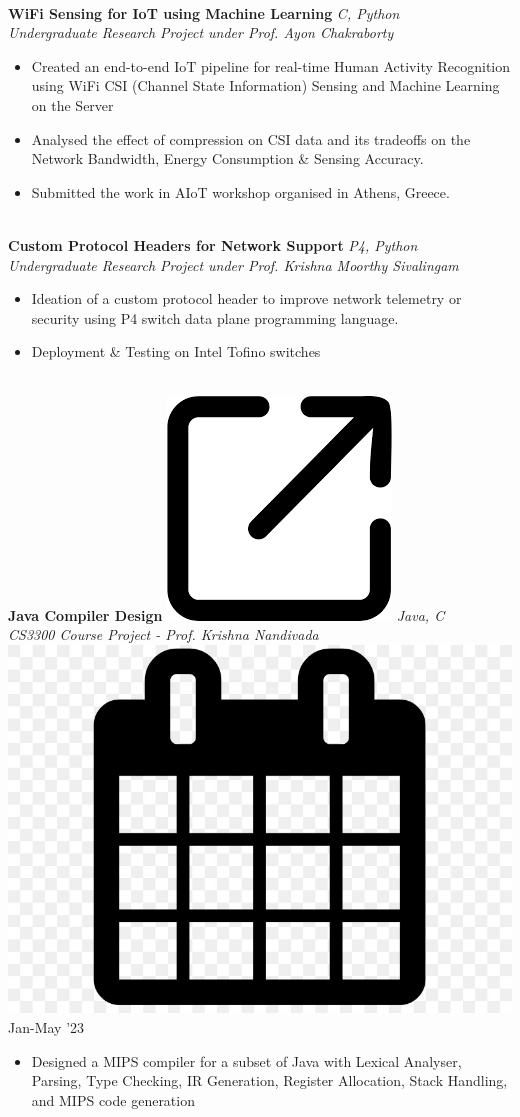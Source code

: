 \documentclass[10pt,article]{article}
\newcommand{\myMargin}{0.15in}
\newcommand{\myfont}[2]{\fontsize{#1}{#1}\selectfont #2}
\newcommand{\projecttopic}[1]{\myfont{9pt}{\textbf{#1}}}
\newcommand{\projectdesc}[1]{\myfont{9pt}{\textcolor{projDescColor}{\textit{#1}}}}
\newcommand{\mylink}[1]{\href{#1}{\includegraphics[scale=0.03]{download.png}}}
\newcommand{\mycal}[1]{\includegraphics[scale=0.018]{calendar.png} \myfont{9}{#1}}
\begin{document}
\begin{multicols*}{2}
\noindent
\hrulefill \\ [-0.45cm]
\projecttopic{WiFi Sensing for IoT using Machine Learning} \hfill \textcolor{projDescColor}{\textit{C, Python}} \\ [0.1cm]
\projectdesc{Undergraduate Research Project under Prof. Ayon Chakraborty}
\begin{itemize}[leftmargin=\myMargin]
    \setlength \itemsep{-0.1em}
    \item Created an end-to-end IoT pipeline for real-time Human Activity Recognition using WiFi CSI (Channel State Information) Sensing and Machine Learning on the Server
    \item Analysed the effect of compression on CSI data and its tradeoffs on the Network Bandwidth, Energy Consumption \& Sensing Accuracy.
    \item Submitted the work in AIoT workshop organised in Athens, Greece. 
\end{itemize}
\vspace{3pt}
\noindent
\hrulefill \\ [-0.45cm]
\projecttopic{Custom Protocol Headers for Network Support} \hfill \textcolor{projDescColor}{\textit{P4, Python}}\\[0.1cm]
\projectdesc{Undergraduate Research Project under Prof. Krishna Moorthy Sivalingam}
\vspace{1pt}
\begin{itemize}[leftmargin=\myMargin]
    \setlength \itemsep{-0.1em}
    \item Ideation of a custom protocol header to improve network telemetry or security using P4 switch data plane programming language.
    \item Deployment \& Testing on Intel Tofino switches  
\end{itemize}
\vspace{3pt}

\noindent
\hrulefill \\ [-0.5cm]
\projecttopic{Java Compiler Design }
\mylink{insert link here}
\hfill    \textcolor{projDescColor}{\textit{Java, C}}  \\[0.1cm]
\projectdesc{CS3300 Course Project - Prof. Krishna Nandivada} \hfill \mycal{Jan-May '23} \\
\noindent
\vspace{-0.5cm}
\begin{itemize}[leftmargin=\myMargin]
    \item Designed a MIPS compiler for a subset of Java with Lexical Analyser, Parsing, Type Checking, IR Generation, Register Allocation, Stack Handling, and MIPS code generation
\end{itemize}
\vspace{5pt}


\end{multicols*}
\end{document}
